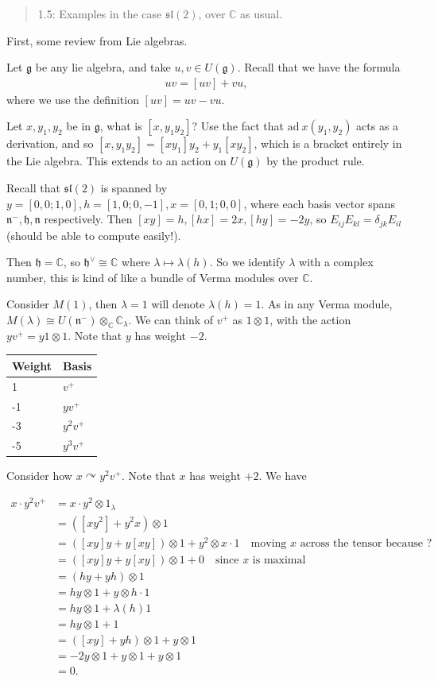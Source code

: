 \documentclass[11pt]{scrartcl}
\theoremstyle{definition}
\theoremstyle{theorem}
\theoremstyle{proof}
\theoremstyle{definition}
\theoremstyle{break}
\theoremstyle{problem}
\newcommand{\CC}[0]{{\mathbb{C}}}
\newcommand{\ad}[0]{\mathrm{ad}~}
\newcommand{\actson}[0]{\curvearrowright}
\newcommand{\dual}[0]{^\vee}
\newcommand{\lieg}[0]{{\mathfrak{g}}}
\newcommand{\lieh}[0]{{\mathfrak{h}}}
\newcommand{\lien}[0]{{\mathfrak{n}}}
\newcommand{\liesl}[0]{{\mathfrak{sl}}}
\newcommand{\tensor}[0]{\otimes}
\begin{document}
\begin{quote}
1.5: Examples in the case \(\liesl(2)\), over \(\CC\) as usual.
\end{quote}

First, some review from Lie algebras.

Let \(\lieg\) be any lie algebra, and take \(u, v \in U(\lieg)\). Recall
that we have the formula
\begin{align*}uv = [uv] + vu,\end{align*} where we use the definition
\([uv] = uv - vu\).

Let \(x, y_1, y_2\) be in \(\lieg\), what is \([x, y_1 y_2]\)? Use the
fact that \(\ad x (y_1, y_2)\) acts as a derivation, and so
\([x, y_1 y_2] = [x y_1]y_2 + y_1[x y_2]\), which is a bracket entirely
in the Lie algebra. This extends to an action on \(U(\lieg)\) by the
product rule.

Recall that \(\liesl(2)\) is spanned by
\(y =[0,0; 1,0], h = [1,0; 0, -1], x = [0,1; 0,0]\), where each basis
vector spans \(\lien^-, \lieh, \lien\) respectively. Then
\([x y] = h, [h x] = 2x, [h y] = -2y\), so
\(E_{ij} E_{kl} = \delta_{jk} E_{il}\) (should be able to compute
easily!).

Then \(\lieh = \CC\), so \(\lieh\dual \cong \CC\) where
\(\lambda \mapsto \lambda(h)\). So we identify \(\lambda\) with a
complex number, this is kind of like a bundle of Verma modules over
\(\CC\).

Consider \(M(1)\), then \(\lambda = 1\) will denote \(\lambda(h) = 1\).
As in any Verma module,
\(M(\lambda) \cong U(\lien^-) \tensor_\CC \CC_{\lambda}\). We can think
of \(v^+\) as \(1\tensor 1\), with the action \(yv^+ = y1\tensor 1\).
Note that \(y\) has weight \(-2\).

\begin{longtable}[]{@{}ll@{}}
\toprule
Weight & Basis\tabularnewline
\midrule
\endhead
1 & \(v^+\)\tabularnewline
-1 & \(yv^+\)\tabularnewline
-3 & \(y^2 v^+\)\tabularnewline
-5 & \(y^3 v^+\)\tabularnewline
\bottomrule
\end{longtable}

Consider how \(x\actson y^2 v^+\). Note that \(x\) has weight \(+2\). We
have

\begin{align*}
x \cdot y^2 v^+ 
&= x \cdot y^2 \tensor 1_\lambda \\
&= ([x y^2] + y^2 x) \tensor 1 \\
&= ([xy]y + y[xy]) \tensor 1 + y^2 \tensor x\cdot 1 \quad\text{moving $x$ across the tensor because ?}\\
&= ([xy]y + y[xy]) \tensor 1 + 0  \quad\text{since $x$ is maximal} \\
&= (hy + yh) \tensor 1 \\
&= hy \tensor 1 + y\tensor h\cdot 1 \\
&= hy \tensor 1 + \lambda(h)1 \\
&= hy \tensor 1 + 1 \\
&= ([xy] + yh)\tensor 1 + y\tensor 1 \\
&= -2y \tensor 1 + y\tensor 1 + y\tensor 1 \\
&= 0
.\end{align*}
\end{document}
